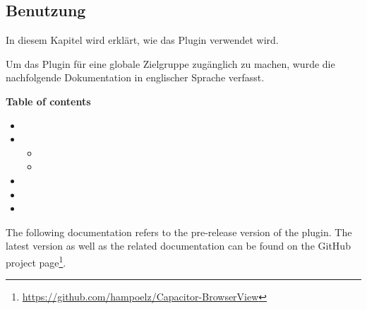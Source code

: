 \subsection{Benutzung}

In diesem Kapitel wird erklärt, wie das Plugin verwendet wird.

Um das Plugin für eine globale Zielgruppe zugänglich zu machen, wurde die nachfolgende Dokumentation in englischer Sprache verfasst.

\vspace{2em}

\textbf{Table of contents}

\begin{itemize}
  \setlength\itemsep{-1em}
  \item {}
  \item {}
  \vspace{\itemsep}
  \begin{itemize}
    \setlength\itemsep{-1em}
    \item {}
    \item {}
  \end{itemize}
  \item {}
  \item {}
  \item {}
\end{itemize}

\vspace{1em}

The following documentation refers to the pre-release version  of the plugin.
The latest version as well as the related documentation can be found on the GitHub project page\footnote{\url{https://github.com/hampoelz/Capacitor-BrowserView}}.

\clearpage



\clearpage


\clearpage


\clearpage


